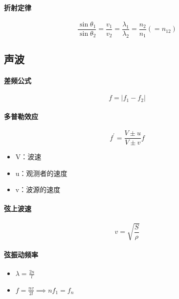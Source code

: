 \paragraph{折射定律}
\begin{equation*}
    \frac{\sin\theta_1}{\sin\theta_2}=
    \frac{v_1}{v_2}=
    \frac{\lambda_1}{\lambda_2}=
    \frac{n_2}{n_1}(=n_{12})
\end{equation*}

\subsection{声波}

\paragraph{差频公式}
\begin{equation*}
    f=|f_1-f_2|
\end{equation*}

\paragraph{多普勒效应}
\begin{equation*}
    f^\prime=\frac{V\pm u}{V\pm v}f
\end{equation*}
\begin{itemize}
    \item V：波速
    \item u：观测者的速度
    \item v：波源的速度
\end{itemize}

\paragraph{弦上波速}
\begin{equation*}
    v=\sqrt{\frac{S}{\rho}}
\end{equation*}

\paragraph{弦振动频率}
\begin{itemize}
    \item $\lambda=\frac{2n}{l}$
    \item $f=\frac{nv}{2l}\implies nf_1=f_n$
\end{itemize}

